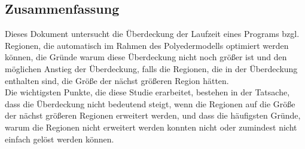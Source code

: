 \vfill

\begin{otherlanguage}{ngerman}
    \chapter*{Zusammenfassung}
    Dieses Dokument untersucht die Überdeckung der Laufzeit eines Programs bzgl. Regionen, die automatisch im Rahmen des Polyedermodells optimiert werden können, die Gründe warum diese Überdeckung nicht noch größer ist und den möglichen Anstieg der Überdeckung, falls die Regionen, die in der Überdeckung enthalten sind, die Größe der nächst größeren Region hätten.\\
    Die wichtigsten Punkte, die diese Studie erarbeitet, bestehen in der Tatsache, dass die Überdeckung nicht bedeutend steigt, wenn die Regionen auf die Größe der nächst größeren Regionen erweitert werden, und dass die häufigsten Gründe, warum die Regionen nicht erweitert werden konnten nicht oder zumindest nicht einfach gelöst werden können.
\end{otherlanguage}

\endgroup

\vfill
